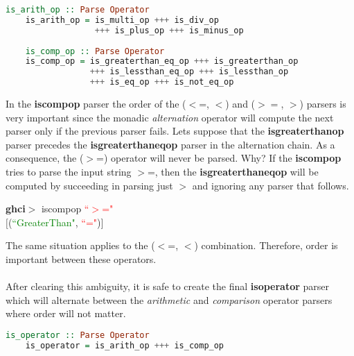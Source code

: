 \documentclass[a4paper, onecolumn]{article}
\begin{document}
    \begin{tcolorbox}
    \begin{lstlisting}[language=Haskell] 
    is_arith_op :: Parse Operator 
    is_arith_op = is_multi_op +++ is_div_op 
                  +++ is_plus_op +++ is_minus_op
                  
    is_comp_op :: Parse Operator
    is_comp_op = is_greaterthan_eq_op +++ is_greaterthan_op 
                 +++ is_lessthan_eq_op +++ is_lessthan_op 
                 +++ is_eq_op +++ is_not_eq_op
    \end{lstlisting}
    \end{tcolorbox}
    
    \noindent In the \textbf{is\textunderscore comp\textunderscore op} parser the order of the ($<$=, $<$) and ($>=$, $>$) parsers is very important since the monadic \textit{alternation} operator will compute the next parser only if the previous parser fails. Lets suppose that the \textbf{is\textunderscore greaterthan\textunderscore op} parser precedes the \textbf{is\textunderscore greaterthan\textunderscore eq\textunderscore op} parser in the alternation chain. As a consequence, the ($>$=) operator will never be parsed. Why? If the \textbf{is\textunderscore comp\textunderscore op} tries to parse the input string $>$=, then the \textbf{is\textunderscore greaterthan\textunderscore eq\textunderscore op} will be computed by succeeding in parsing just $>$ and ignoring any parser that follows.
    
    \begin{center}
            \textbf{ghci$>$} is\textunderscore comp\textunderscore op \textcolor{red}{``$>$="} \\
             $\big[$(\textcolor{green}{``GreaterThan"}, \textcolor{red}{``="})$\big]$
        \end{center}
    
    \noindent The same situation applies to the ($<$=, $<$) combination. Therefore, order is important between these operators. \\ \\ 
    After clearing this ambiguity, it is safe to create the final \textbf{is\textunderscore operator} parser which will alternate between the \textit{arithmetic} and \textit{comparison} operator parsers where order will not matter. 
    
    \begin{tcolorbox}
    \begin{lstlisting}[language=Haskell] 
    is_operator :: Parse Operator 
    is_operator = is_arith_op +++ is_comp_op
    \end{lstlisting}
    \end{tcolorbox}
    
\end{document}

